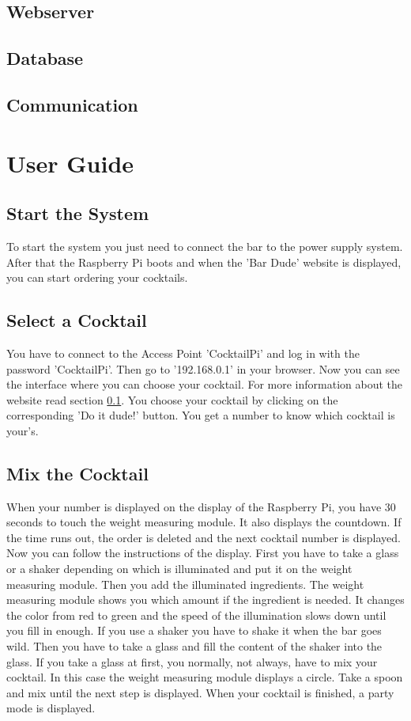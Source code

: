 \documentclass{acm_proc_article-sp}
\begin{document}
\subsection{Webserver}
\label{sec:webserver}
\subsection{Database}
\subsection{Communication}
\section{User Guide}
\subsection{Start the System}
To start the system you just need to connect the bar to the power supply system. After that the Raspberry Pi boots and when the 'Bar Dude' website is displayed, you can start ordering your cocktails.
\subsection{Select a Cocktail}
You have to connect to the Access Point 'CocktailPi' and log in with the password 'CocktailPi'. Then go to '192.168.0.1' in your browser. Now you can see the interface where you can choose your cocktail. For more information about the website read section \ref{sec:webserver}. You choose your cocktail by clicking on the corresponding 'Do it dude!' button. You get a number to know which cocktail is your's.
\subsection{Mix the Cocktail}
When your number is displayed on the display of the Raspberry Pi, you have 30 seconds to touch the weight measuring module. It also displays the countdown. If the time runs out, the order is deleted and the next cocktail number is displayed. \\
Now you can follow the instructions of the display. First you have to take a glass or a shaker depending on which is illuminated and put it on the weight measuring module. Then you add the illuminated ingredients. The weight measuring module shows you which amount if the ingredient is needed. It changes the color from red to green and the speed of the illumination slows down until you fill in enough. If you use a shaker you have to shake it when the bar goes wild. Then you have to take a glass and fill the content of the shaker into the glass. If you take a glass at first, you normally, not always, have to mix your cocktail. In this case the weight measuring module displays a circle. Take a spoon and mix until the next step is displayed. When your cocktail is finished, a party mode is displayed. 
\end{document}
